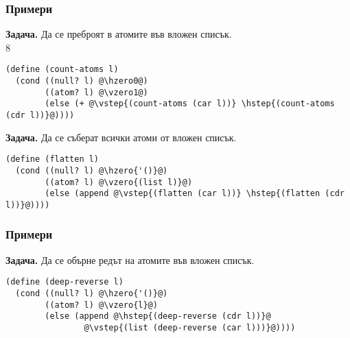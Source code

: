 \documentclass{beamer}
\begin{document}
\begin{frame}[fragile]
  \frametitle{Примери}
  \small
  \textbf{Задача.} Да се преброят в атомите във вложен списък.\\
  8
  \pause
\begin{lstlisting}
(define (count-atoms l)
  (cond ((null? l) @\hzero0@)
        ((atom? l) @\vzero1@)
        (else (+ @\vstep{(count-atoms (car l))} \hstep{(count-atoms (cdr l))}@))))
\end{lstlisting}
  \vspace{1em}
  \pause
  \textbf{Задача.} Да се съберат всички атоми от вложен списък.\\
  \pause
\begin{lstlisting}
(define (flatten l)
  (cond ((null? l) @\hzero{'()}@)
        ((atom? l) @\vzero{(list l)}@)
        (else (append @\vstep{(flatten (car l))} \hstep{(flatten (cdr l))}@))))
\end{lstlisting}
\end{frame}

\begin{frame}[fragile]
  \frametitle{Примери}

  \textbf{Задача.} Да се обърне редът на атомите във вложен списък.\\
  \pause
\begin{lstlisting}
(define (deep-reverse l)
  (cond ((null? l) @\hzero{'()}@)
        ((atom? l) @\vzero{l}@)
        (else (append @\hstep{(deep-reverse (cdr l))}@
                @\vstep{(list (deep-reverse (car l)))}@))))
\end{lstlisting}
\end{frame}
\end{document}
